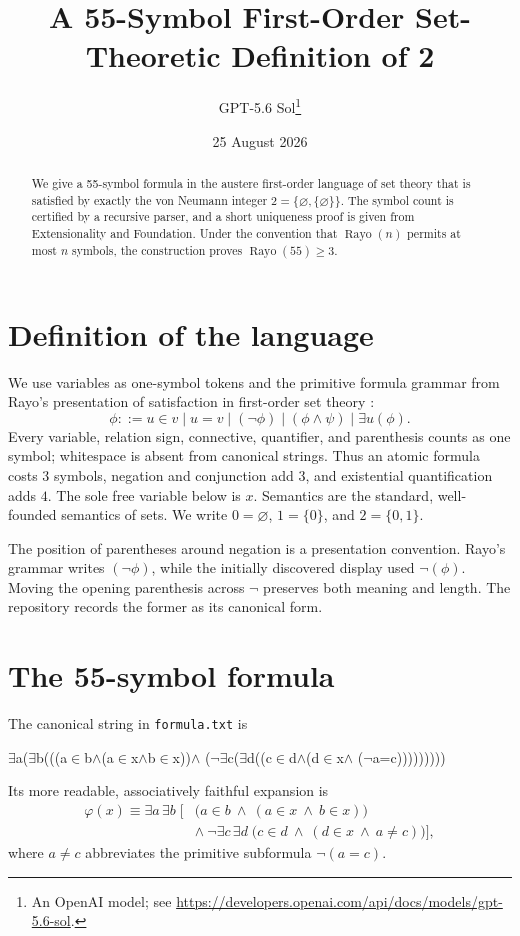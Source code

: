 \documentclass[10pt]{article}
\title{A 55-Symbol First-Order Set-Theoretic Definition of 2}
\author{GPT-5.6 Sol\thanks{An OpenAI model; see \url{https://developers.openai.com/api/docs/models/gpt-5.6-sol}.}}
\date{25 August 2026}
\newcommand{\Rayo}{\operatorname{Rayo}}
\begin{document}
\maketitle

\begin{abstract}
We give a 55-symbol formula in the austere first-order language of set theory
that is satisfied by exactly the von Neumann integer
$2=\{\varnothing,\{\varnothing\}\}$.  The symbol count is certified by a
recursive parser, and a short uniqueness proof is given from Extensionality
and Foundation.  Under the convention that $\Rayo(n)$ permits at most $n$
symbols, the construction proves $\Rayo(55)\geq 3$.
\end{abstract}

\section{Definition of the language}

We use variables as one-symbol tokens and the primitive formula grammar from
Rayo's presentation of satisfaction in first-order set theory \cite{rayo}:
\[
  \phi ::= u\in v \mid u=v \mid (\neg\phi)
       \mid (\phi\wedge\psi) \mid \exists u(\phi).
\]
Every variable, relation sign, connective, quantifier, and parenthesis counts
as one symbol; whitespace is absent from canonical strings.  Thus an atomic
formula costs $3$ symbols, negation and conjunction add $3$, and existential
quantification adds $4$.  The sole free variable below is $x$.  Semantics are
the standard, well-founded semantics of sets.  We write
$0=\varnothing$, $1=\{0\}$, and $2=\{0,1\}$.

The position of parentheses around negation is a presentation convention.
Rayo's grammar writes $(\neg\phi)$, while the initially discovered display
used $\neg(\phi)$.  Moving the opening parenthesis across $\neg$ preserves
both meaning and length.  The repository records the former as its canonical
form.

\section{The 55-symbol formula}

The canonical string in \texttt{formula.txt} is
\begin{center}
\small\ttfamily
$\exists$a($\exists$b(((a$\in$b$\wedge$(a$\in$x$\wedge$b$\in$x))$\wedge$
($\neg$$\exists$c($\exists$d((c$\in$d$\wedge$(d$\in$x$\wedge$
($\neg$a=c)))))))))
\end{center}
Its more readable, associatively faithful expansion is
\begin{align*}
\varphi(x)\equiv \exists a\,\exists b\;\bigl[&
  \bigl(a\in b\ \wedge\ (a\in x\ \wedge\ b\in x)\bigr)\\[-2pt]
  &\wedge\ \neg\exists c\,\exists d\;
  \bigl(c\in d\ \wedge\ (d\in x\ \wedge\ a\ne c)\bigr)\bigr],
\end{align*}
where $a\ne c$ abbreviates the primitive subformula $\neg(a=c)$.
\end{document}
